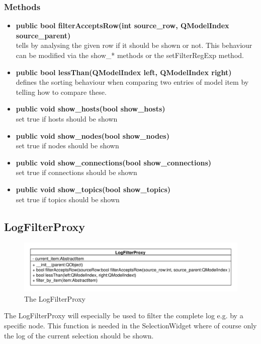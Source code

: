 \subsubsection{Methods}
\begin{itemize}
  \item \textbf{public bool filterAcceptsRow(int source\_row, QModelIndex
  source\_parent)}\\
  tells by analysing the given row if it should be shown or not. This behaviour can be modified via the show\_* methods or the setFilterRegExp method.
  \item \textbf{public bool lessThan(QModelIndex left, QModelIndex right)}\\
  defines the sorting behaviour when comparing two entries of model item by telling how to compare these.
  \item \textbf{public void show\_hosts(bool show\_hosts)}\\
  set true if hosts should be shown
  \item \textbf{public void show\_nodes(bool show\_nodes)}\\
  set true if nodes should be shown
  \item \textbf{public void show\_connections(bool show\_connections)}\\
  set true if connections should be shown
  \item \textbf{public void show\_topics(bool show\_topics)}\\
  set true if topics should be shown
\end{itemize}

\subsection{LogFilterProxy}
\begin{figure}[htbp]
	\begin{minipage}[t]{7cm}
		\vspace{0pt}
		\centering
		\includegraphics[scale=0.6]{./diagram_pictures/LogFilter.pdf}
		\caption{The LogFilterProxy}
	\end{minipage}	
\end{figure} 
The LogFilterProxy will especially be used to filter the complete log e.g. by a
specific node. This function is needed in the SelectionWidget where of course
only the log of the current selection should be shown.
